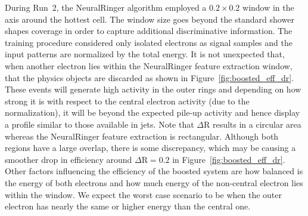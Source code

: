 During Run~2, the NeuralRinger algorithm employed a $0.2\times0.2$ window in the
\etaphi axis around the hottest cell. The window size goes beyond the standard
shower shapes coverage in order to capture additional discriminative
information. The training procedure considered only isolated electrons as signal
samples and the input patterns are normalized by the total energy. It is not
unexpected that, when another electron lies within the NeuralRinger feature extraction
window, that the physics objects are discarded as shown in
Figure~\ref{fig:boosted_eff_dr}. These events will generate high activity in the
outer rings and depending on how strong it is with respect to the central
electron activity (due to the normalization), it will be beyond the expected
pile-up activity and hence display a profile similar to those available in jets.
Note that $\Delta$R results in a circular area whereas the NeuralRinger feature
extraction is rectangular. Although both regions have a large overlap, there is
some discrepancy, which may be causing a smoother drop in efficiency around
$\Delta\text{R}=0.2$ in Figure~\ref{fig:boosted_eff_dr}. Other factors influencing the efficiency of the boosted system are
how balanced is the energy of both electrons and how much energy of
the non-central electron lies within
the window. We expect the worst case scenario to be when the outer electron has
nearly the same or higher energy than the central one.




